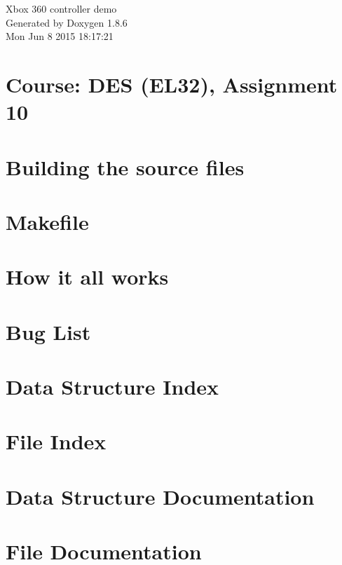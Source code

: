 \documentclass[twoside]{article}
\begin{document}
\begin{titlepage}
\vspace*{7cm}
\begin{center}%
{\Large Xbox 360 controller demo }\\
\vspace*{1cm}
{\large Generated by Doxygen 1.8.6}\\
\vspace*{0.5cm}
{\small Mon Jun 8 2015 18:17:21}\\
\end{center}
\end{titlepage}
\tableofcontents
{}

\section{Course\-: D\-E\-S (E\-L32), Assignment 10}
\label{index}
\section{Building the source files}
\label{page1}

\section{Makefile}
\label{page2}

\section{How it all works}
\label{page3}

\section{Bug List}
\label{bug}

\section{Data Structure Index}

\section{File Index}

\section{Data Structure Documentation}

\section{File Documentation}








\newpage
{}
{}
\printindex
\end{document}
